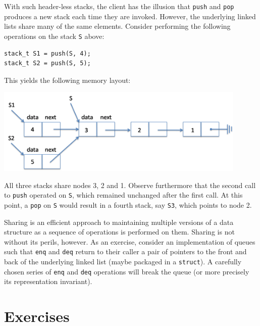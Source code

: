 With such header-less stacks, the client has the illusion that
\lstinline'push' and \lstinline'pop' produces a new stack each time
they are invoked.  However, the underlying linked lists share many of
the same elements.  Consider performing the following operations on the
stack \lstinline'S' above:
\begin{lstlisting}[language={[C0]C}]
stack_t S1 = push(S, 4);
stack_t S2 = push(S, 5);
\end{lstlisting}
This yields the following memory layout:
\begin{center}
  \includegraphics[width=0.9\textwidth]{img/stackC-push2.png}
\end{center}
All three stacks share nodes 3, 2 and 1.  Observe furthermore that the
second call to \lstinline'push' operated on \lstinline'S', which
remained unchanged after the first call.  At this point, a
\lstinline'pop' on \lstinline'S' would result in a fourth stack, say
\lstinline'S3', which points to node 2.

Sharing is an efficient approach to maintaining multiple versions of a
data structure as a sequence of operations is performed on them.
Sharing is not without its perils, however.  As an exercise, consider
an implementation of queues such that \lstinline'enq' and
\lstinline'deq' return to their caller a pair of pointers to the front
and back of the underlying linked list (maybe packaged in a
\lstinline'struct').  A carefully chosen series of \lstinline'enq' and
\lstinline'deq' operations will break the queue (or more precisely its
representation invariant).


\clearpage
\section{Exercises}
\label{sec:linkedlist:exercises}

